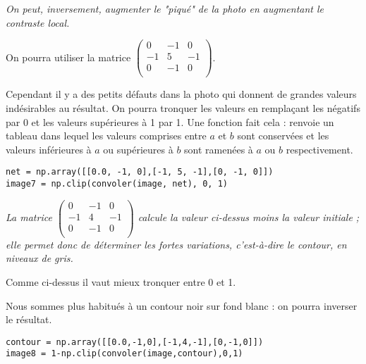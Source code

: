 \begin{Exercise}[title=Netteté]\it On peut, inversement, augmenter le "piqué" de la photo en augmentant le contraste local. 

On pourra utiliser la matrice $\begin{pmatrix} 0&-1&0\\ -1&5&-1\\ 0&-1&0\\ \end{pmatrix}$.

Cependant il y a des petits défauts dans la photo qui donnent de grandes valeurs indésirables au résultat. On pourra tronquer les valeurs en remplaçant les négatifs par 0 et les valeurs supérieures à 1 par 1. 
Une fonction  fait cela :  renvoie un tableau  dans lequel les valeurs comprises entre $a$ et $b$ sont conservées et les valeurs inférieures à $a$ ou supérieures à $b$ sont ramenées à $a$ ou $b$ respectivement.
\end{Exercise}
\begin{Answer} 
\begin{lstlisting}
net = np.array([[0.0, -1, 0],[-1, 5, -1],[0, -1, 0]])            
image7 = np.clip(convoler(image, net), 0, 1)
\end{lstlisting}
\end{Answer}
\begin{Exercise}[title=Contour 1]\it La matrice 
$\begin{pmatrix} 0&-1&0\\ -1&4&-1\\ 0&-1&0\\ \end{pmatrix}$ calcule la valeur ci-dessus moins la valeur initiale ; elle permet donc de déterminer les fortes variations, c'est-à-dire le contour, en niveaux de gris.

Comme ci-dessus il vaut mieux tronquer entre 0 et 1.

Nous sommes plus habitués à un contour noir sur fond blanc : on pourra inverser le résultat.
\end{Exercise}
\begin{Answer} 
\begin{lstlisting}
contour = np.array([[0.0,-1,0],[-1,4,-1],[0,-1,0]])            
image8 = 1-np.clip(convoler(image,contour),0,1)
\end{lstlisting}
\end{Answer}
